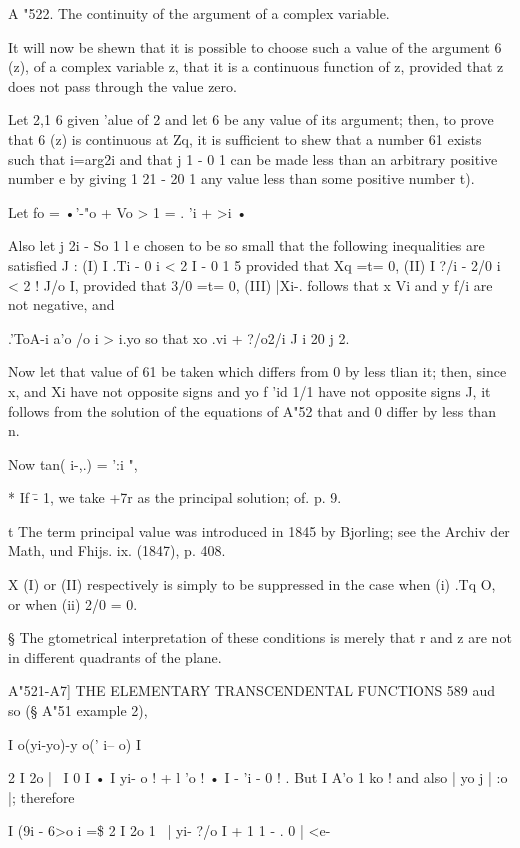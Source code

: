 A "522. The continuity of the argument of a complex variable.

It will now be shewn that it is possible to choose such a value of the
argument 6 (z), of a complex variable z, that it is a continuous
function of z, provided that z does not pass through the value zero.

Let 2,1 6 given 'alue of 2 and let 6 be any value of its argument;
then, to prove that 6 (z) is continuous at Zq, it is sufficient to
shew that a number 61 exists such that i=arg2i and that j 1 - 0 1 can
be made less than an arbitrary positive number e by giving 1 21 - 20 1
any value less than some positive number t).

Let fo = •'-"o + Vo > 1 = . 'i + >i •

Also let j 2i - So 1 l e chosen to be so small that the following
inequalities are satisfied J : (I) I .Ti - 0 i < 2 I - 0 1 5 provided
that Xq =t= 0, (II) I ?/i - 2/0 i < 2 ! J/o I, provided that 3/0 =t=
0, (III) |Xi-.%
follows that x Vi and y f/i are not negative, and

.'ToA-i a'o /o i > i.yo so that xo .vi + ?/o2/i J i 20 j 2.

Now let that value of 61 be taken which differs from 0 by less tlian
it; then, since x, and Xi have not opposite signs and yo f 'id 1/1
have not opposite signs J, it follows from the solution of the
equations of A"52 that and 0 differ by less than n.

Now tan( i-,.) = ':i ",

* If \= - 1, we take +7r as the principal solution; of. p. 9.

t The term principal value was introduced in 1845 by Bjorling; see
the Archiv der Math, und Fhijs. ix. (1847), p. 408.

X (I) or (II) respectively is simply to be suppressed in the case when
(i) .Tq O, or when (ii) 2/0 = 0.

§ The gtometrical interpretation of these conditions is merely that r
and z are not in different quadrants of the plane.



A"521-A7] THE ELEMENTARY TRANSCENDENTAL FUNCTIONS 589 aud so (§ A"51
example 2),

  I o(yi-yo)-y o(' i-- o) I

  2 I 2o |~ I 0 I • I yi- o ! + l 'o ! • I - 'i - 0 ! . But I A'o 1 ko
! and also | yo j | :o |; therefore

I (9i - 6>o i =\$ 2 I 2o 1~ | yi- ?/o I + 1 1 - . 0 | <e-

